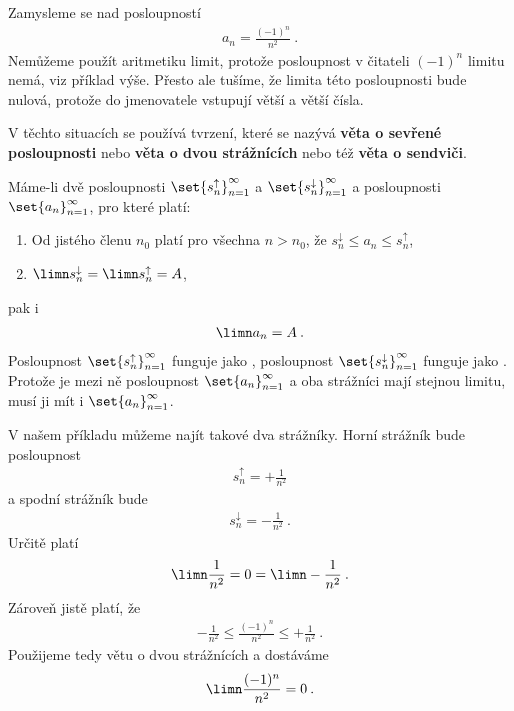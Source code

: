 Zamysleme se nad posloupností
\begin{align}
    a_n = \frac{(-1)^n}{n^2} \:.
\end{align}
Nemůžeme použít aritmetiku limit, protože posloupnost v čitateli $(-1)^n$ limitu nemá, viz příklad výše. Přesto ale tušíme, že limita této posloupnosti bude nulová, protože do jmenovatele vstupují větší a větší čísla.

V těchto situacích se používá tvrzení, které se nazývá \textbf{věta o sevřené posloupnosti} nebo \textbf{věta o dvou strážnících} nebo též \textbf{věta o sendviči}.

Máme-li dvě posloupnosti $\set{s^{\uparrow}_n}_{n=1}^\infty$ a $\set{s^{\downarrow}_n}_{n=1}^\infty$ a posloupnosti $\set{a_n}_{n=1}^\infty$, pro které platí:
\begin{enumerate}
    \item Od jistého členu $n_0$ platí pro všechna $n>n_0$, že $s^{\downarrow}_n \leq a_n \leq s^{\uparrow}_n$,
    \item $\limn s_n^{\downarrow} = \limn s_n^{\uparrow} = A$,
\end{enumerate}
pak i \begin{align}
    \limn a_n = A \:.
\end{align}
Posloupnost $\set{s^{\uparrow}_n}_{n=1}^\infty$ funguje jako , posloupnost $\set{s^{\downarrow}_n}_{n=1}^\infty$ funguje jako . Protože je mezi ně posloupnost $\set{a_n}_{n=1}^\infty$  a oba strážníci mají stejnou limitu, musí ji mít i $\set{a_n}_{n=1}^\infty$.

V našem příkladu můžeme najít takové dva strážníky. Horní strážník bude posloupnost
\begin{align}
    s_n^{\uparrow} = + \frac{1}{n^2}
\end{align}
a spodní strážník bude
\begin{align}
    s_n^{\downarrow} = - \frac{1}{n^2} \:.
\end{align}
Určitě platí \begin{align}
    \limn \frac{1}{n^2} = 0 = \limn -\frac{1}{n^2} \:.
\end{align}
Zároveň jistě platí, že \begin{align}
    -\frac{1}{n^2} \leq \frac{(-1)^n}{n^2} \leq +\frac{1}{n^2} \:.
\end{align}
Použijeme tedy větu o dvou strážnících a dostáváme
\begin{align}
    \limn \frac{(-1)^n}{n^2} = 0 \:.
\end{align}

